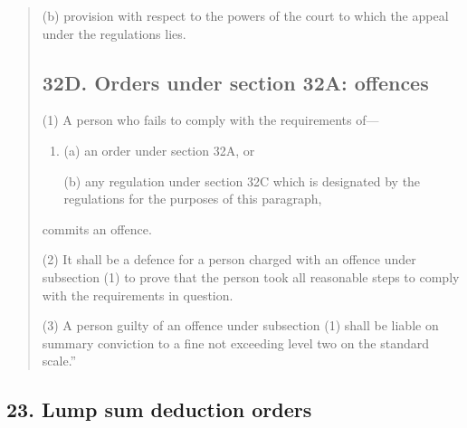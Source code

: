 \documentclass[a4paper]{article}
\begin{document}
\begin{quotation}
\begin{enumerate}
(b) provision with respect to the powers of the court to which the appeal under the regulations lies.
\end{enumerate}

\subsection*{32D. Orders under section 32A: offences}

(1) A person who fails to comply with the requirements of---
\begin{enumerate}\item[]
(a) an order under section 32A, or

(b) any regulation under section 32C which is designated by the regulations for
the purposes of this paragraph, 
\end{enumerate}
commits an offence.

(2)
It shall be a defence for a person charged with an offence under subsection (1) to prove that the person took all reasonable steps to comply with the requirements in question.

(3)
A person guilty of an offence under subsection (1) shall be liable on summary conviction to a fine not exceeding level two on the standard scale.''
\end{quotation}

\subsection{23. Lump sum deduction orders}
\end{document}
